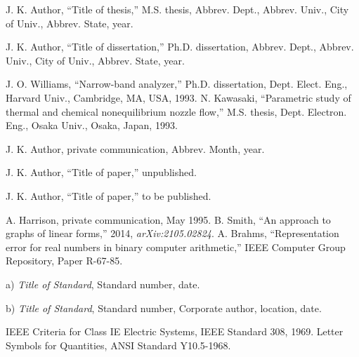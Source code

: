 \documentclass[correspondence]{IEEEtaes}
\begin{document}
\vspace*{-12pt}
\begin{thebibliography}{[31d]}
\item[] J. K. Author, ``Title of thesis,'' M.S. thesis, Abbrev. Dept., Abbrev. Univ., City of Univ., Abbrev. State, year.
\item[] J. K. Author, ``Title of dissertation,'' Ph.D. dissertation, Abbrev. Dept., Abbrev. Univ., City of Univ., Abbrev. State, year.
\end{thebibliography}

\vspace*{-12pt}
\begin{thebibliography}{[31d]}
\setcounter{enumiv}{18}
J. O. Williams, ``Narrow-band analyzer,'' Ph.D. dissertation, Dept. Elect. Eng., Harvard Univ., Cambridge, MA, USA, 1993.{\vfill\pagebreak}
N. Kawasaki, ``Parametric study of thermal and chemical nonequilibrium nozzle flow,'' M.S. thesis, Dept. Electron. Eng., Osaka Univ., Osaka, Japan, 1993.
\end{thebibliography}

\vspace*{-12pt}
\begin{thebibliography}{[31d]}
\item[] J. K. Author, private communication, Abbrev. Month, year.
\item[] J. K. Author, ``Title of paper,'' unpublished.
\item[] J. K. Author, ``Title of paper,'' to be published.
\end{thebibliography}

\vspace*{-12pt}

\begin{thebibliography}{[31d]}
\setcounter{enumiv}{20}
A. Harrison, private communication, May 1995.
B. Smith, ``An approach to graphs of linear forms,'' 2014, \emph{arXiv:2105.02824}.
A. Brahms, ``Representation error for real numbers in binary computer arithmetic,'' IEEE Computer Group Repository, Paper R-67-85.
\end{thebibliography}


\vspace*{-12pt}
\begin{thebibliography}{[31d]}
\item[a)]\emph{Title of Standard}, Standard number, date.
\item[b)]\emph{Title of Standard}, Standard number, Corporate author, location, date.
\end{thebibliography}


\vspace*{-12pt}
\begin{thebibliography}{[31d]}
\setcounter{enumiv}{23}

IEEE Criteria for Class IE Electric Systems, IEEE Standard 308, 1969.
Letter Symbols for Quantities, ANSI Standard Y10.5-1968.
\end{thebibliography}
\end{document}
